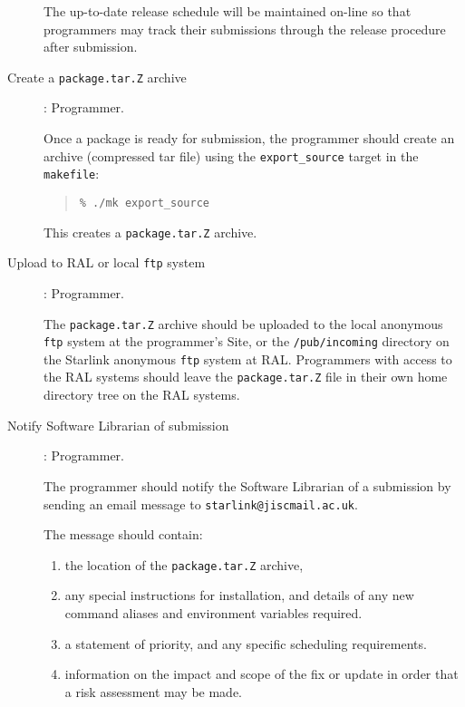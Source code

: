 \documentclass[twoside,11pt]{article}
\begin{document}
\begin{description}
The up-to-date release schedule will be maintained on-line so that
programmers may track their submissions through the release procedure
after submission.

\item[Create a {\tt{package.tar.Z}} archive]: Programmer.

Once a package is ready for submission, the programmer should create an
archive (compressed tar file) using the {\tt{export\_source}} target in
the {\tt{makefile}}:

\begin{quote}
\begin{verbatim}
% ./mk export_source
\end{verbatim}
\end{quote}

This creates a {\tt{package.tar.Z}} archive.

\item[Upload to RAL or local {\tt{ftp}} system]: Programmer.

The {\tt{package.tar.Z}} archive should be uploaded to the local
anonymous {\tt{ftp}} system at the programmer's Site, or the
{\tt{/pub/incoming}} directory on the Starlink anonymous {\tt{ftp}}
system at RAL.  Programmers with access to the RAL systems should leave
the {\tt{package.tar.Z}} file in their own home directory tree on the RAL
systems.

\item[Notify Software Librarian of submission]: Programmer.

The programmer should notify the Software Librarian of a submission
by sending an email message to {\tt{starlink@jiscmail.ac.uk}}.

The message should contain:

\begin{enumerate}

\item the location of the {\tt{package.tar.Z}} archive,

\item any special instructions for installation, and details of
any new command aliases and environment variables required.

\item a statement of priority, and any specific scheduling requirements.

\item information on the impact and scope of the fix or update in
order that a risk assessment may be made.


\end{enumerate}
\end{description}
\end{document}
